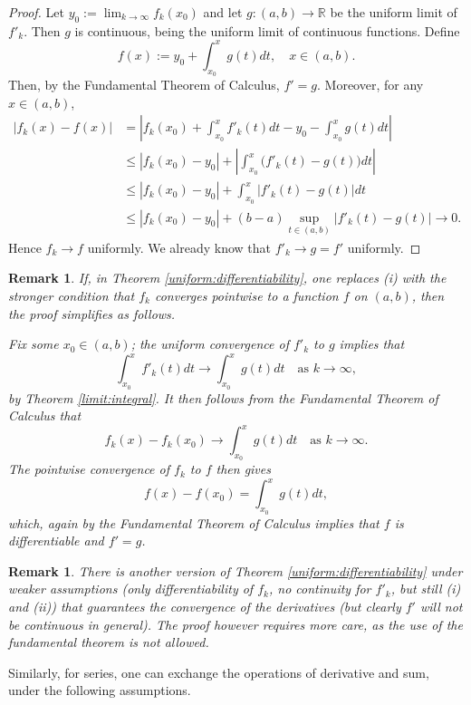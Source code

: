 \documentclass[a4paper,reqno]{amsart}
\numberwithin{equation}{section}
\newtheorem{remark}[definition]{Remark}
\def\R{\mathbb{R}}
\begin{document}
\begin{proof}
Let $y_0:=\lim_{k\to\infty} f_k(x_0)$ and let $g : (a, b) \to \R$ be the uniform limit of $f'_k$. Then $g$ is continuous, being the uniform limit of continuous functions.
Define
$$
f(x):= y_0 + \int_{x_0}^x g(t) dt, \quad x\in (a,b).
$$
Then, by the Fundamental Theorem of Calculus, $f'=g$. Moreover, for any $x\in (a,b)$,
\begin{align*}
|f_k(x) - f(x)|&= \left|f_k(x_0)+\int_{x_0}^x f'_k(t) dt - y_0 - \int_{x_0}^x g(t) dt\right|\\
&\leq |f_k(x_0)-y_0|+ \left| \int_{x_0}^x \Big(f'_k(t) - g(t)\Big) dt \right|\\
&\leq |f_k(x_0)-y_0|+  \int_{x_0}^x \Big|f'_k(t) - g(t)\Big| dt \\
&\leq |f_k(x_0)-y_0|+  (b-a)\sup_{t\in (a,b)}\Big|f'_k(t) - g(t)\Big| \to 0.
\end{align*}
Hence $f_k \to f$ uniformly. We already know that $f'_k \to g = f'$ uniformly.
\end{proof}

\begin{remark}
If, in Theorem \ref{uniform:differentiability}, one replaces (i) with the stronger condition that $f_k$ converges pointwise to a function $f$ on $(a,b)$, then the proof simplifies as follows.

Fix some $x_0\in (a,b)$; the uniform convergence of $f'_k$ to $g$ implies that
$$
\int_{x_0}^x f'_k(t) dt \to \int_{x_0}^x g(t) dt \quad \textrm{as } k\to \infty,
$$
by Theorem \ref{limit:integral}. It then follows from the Fundamental Theorem of Calculus that
$$
f_k(x) - f_k(x_0) \to  \int_{x_0}^x g(t) dt \quad \textrm{as } k\to \infty.
$$
The pointwise convergence of $f_k$ to $f$ then gives
$$
f(x) - f(x_0) =  \int_{x_0}^x g(t) dt,
$$
which, again by the Fundamental Theorem of Calculus implies that $f$ is differentiable and $f'=g$.

\end{remark}

\begin{remark}
There is another version of Theorem \ref{uniform:differentiability} under weaker assumptions (only differentiability of $f_k$, no continuity for $f'_k$, but still (i) and (ii)) that guarantees the convergence of the derivatives (but clearly $f'$ will not be continuous in general). The proof however requires more care, as the use of the fundamental theorem is not allowed.
\end{remark}


Similarly, for series, one can exchange the operations of derivative and sum, under the following assumptions.
\end{document}
